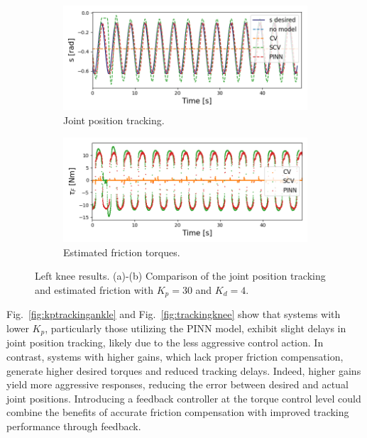 \begin{figure}[t]
\centering
\begin{subfigure}{.48\textwidth}
  \includegraphics[width=0.98\linewidth,center]{figures/knee_sinusoid_tracking_kp30.png}
  \vspace{-20pt}
  \caption{Joint position tracking.}
  \label{fig:kp30trackingknee}
\end{subfigure}%
\hspace{\fill} %
\begin{subfigure}{.48\textwidth}
  \includegraphics[width=0.98\linewidth,center]{figures/knee_friction_kp30.png}
  \vspace{-20pt}
  \caption{Estimated friction torques.}
  \label{fig:kp30frictionknee}
\end{subfigure}
\vspace{-5pt}
\caption{Left knee results. (a)-(b) Comparison of the joint position tracking and estimated friction with $K_p=30$ and $K_d=4$.}
\vspace{-15pt}
\end{figure}

Fig.~\ref{fig:kptrackingankle} and Fig.~\ref{fig:trackingknee} show that systems with lower $K_p$, particularly those utilizing the PINN model, exhibit slight delays in joint position tracking, likely due to the less aggressive control action. In contrast, systems with higher gains, which lack proper friction compensation, generate higher desired torques and reduced tracking delays. Indeed, higher gains yield more aggressive responses, reducing the error between desired and actual joint positions. Introducing a feedback controller at the torque control level could combine the benefits of accurate friction compensation with improved tracking performance through feedback.

